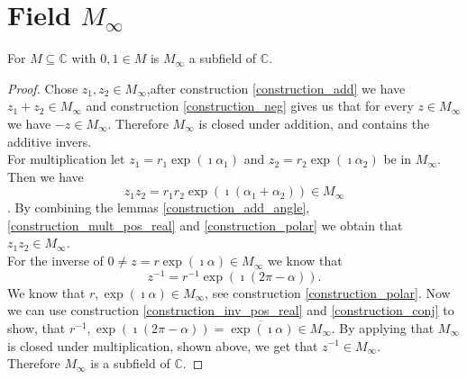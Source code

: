 \section[Filed of Constructable Numbers]{Field $M_{\infty}$}
\begin{theorem}
    \label{M_inf_subfield_C}
    For $M\subseteq \mathbb{C}$ with $0,1 \in M$ is $M_{\infty}$ a subfield of $\mathbb{C}$.
\end{theorem}
\begin{proof}
    Chose $z_1, z_2 \in M_{\infty}$,after construction \ref{construction_add}
    we have $z_1 + z_2 \in M_{\infty}$ and construction \ref{construction_neg}
    gives us that for every $z \in M_{\infty}$ we have $-z \in M_{\infty}$. Therefore $M_{\infty}$ is closed under addition, and contains the additive invers.\\
    For multiplication let $z_1 = r_1 \exp(\imath \alpha_1)$ and $z_2 = r_2 \exp(\imath \alpha_2)$ be in $M_{\infty}$. Then we have 
    $$z_1 z_2 = r_1 r_2 \exp(\imath (\alpha_1 + \alpha_2)) \in M_{\infty}$$. By combining the lemmas \ref{construction_add_angle}, \ref{construction_mult_pos_real} and \ref{construction_polar}
    we obtain that $z_1 z_2 \in M_{\infty}$.\\
    For the inverse of $0 \ne z = r \exp(\imath \alpha) \in M_{\infty}$ we know that $$z^{-1} = r^{-1} \exp(\imath(2\pi - \alpha)).$$ We know that $r, \exp(\imath \alpha) \in M_{\infty}$, see construction \ref{construction_polar}.
    Now we can use construction \ref{construction_inv_pos_real} and \ref{construction_conj} to show,
    that $r^{-1}, \exp(\imath(2\pi - \alpha)) = \overline{\exp(\imath\alpha)} \in M_{\infty}$. By applying that $M_{\infty}$ is closed under multiplication, shown above, we get that $z^{-1} \in M_{\infty}$.\\
    Therefore $M_{\infty}$ is a subfield of $\mathbb{C}$.
\end{proof}

